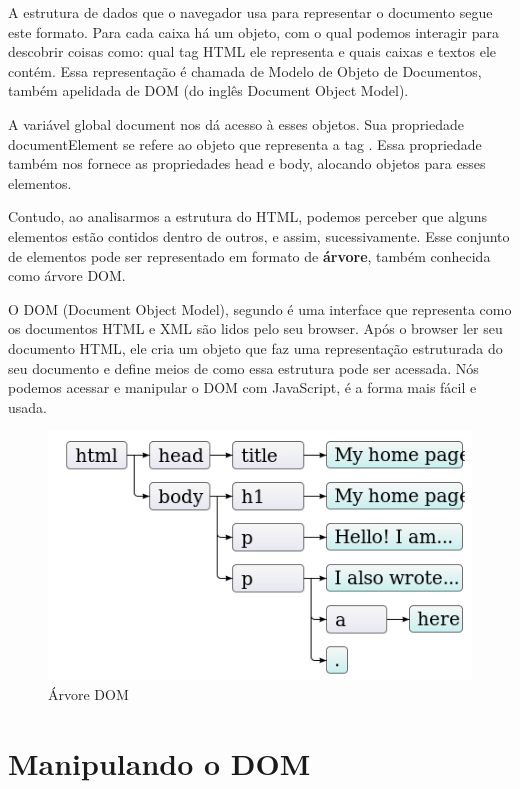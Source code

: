 A estrutura de dados que o navegador usa para representar o documento segue este formato. Para cada caixa há um objeto, com o qual podemos interagir para descobrir coisas como: qual tag HTML ele representa e quais caixas e textos ele contém. Essa representação é chamada de Modelo de Objeto de Documentos, também apelidada de DOM (do inglês Document Object Model).

A variável global document nos dá acesso à esses objetos. Sua propriedade documentElement se refere ao objeto que representa a tag . Essa propriedade também nos fornece as propriedades head e body, alocando objetos para esses elementos.

Contudo, ao analisarmos a estrutura do HTML, podemos perceber que alguns elementos estão contidos dentro de outros, e assim, sucessivamente. Esse conjunto de elementos pode ser representado em formato de \textbf{árvore}, também conhecida como árvore DOM.

O DOM (Document Object Model), segundo   é uma interface que representa como os documentos HTML e XML são lidos pelo seu browser. Após o browser ler seu documento HTML, ele cria um objeto que faz uma representação estruturada do seu documento e define meios de como essa estrutura pode ser acessada. Nós podemos acessar e manipular o DOM com JavaScript, é a forma mais fácil e usada. 

\begin{figure}[H]
	\centering
	\includegraphics[scale=0.6]{imagens/html-tree.jpg}
	\caption{Árvore DOM}
\end{figure}

\section{Manipulando o DOM}

